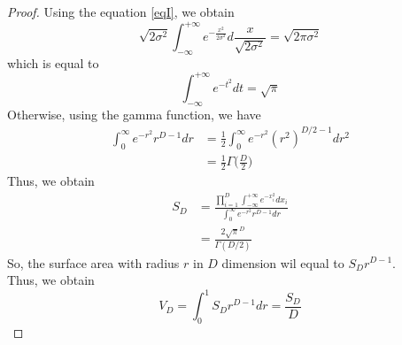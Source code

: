 \documentclass[12pt, a4paper]{article}
\newenvironment{exercise}[2][Ex]{\begin{trivlist}
\item[\hskip \labelsep {\bfseries #1}\hskip \labelsep {\bfseries #2.}]}{\end{trivlist}}
\begin{document}
\begin{exercise}{1.18(**)}
    \begin{proof}
        Using the equation \ref{eqI}, we obtain
        \[
        \sqrt{2\sigma^2}\int_{-\infty}^{+\infty}e^{-\frac{x^2}{2\sigma^2}}d\frac{x}
        {\sqrt{2\sigma^2}}=\sqrt{2\pi\sigma^2}
        \]
        which is equal to
        \begin{equation}
            \label{eq:eint}
            \int_{-\infty}^{+\infty}e^{-t^2}dt=\sqrt{\pi}
        \end{equation}
        Otherwise, using the gamma function, we have 
        \begin{align}
            \int_0^\infty e^{-r^2}r^{D-1}dr&=\frac{1}{2}\int_0^\infty
            e^{-r^2}(r^2)^{D/2-1}dr^2\nonumber\\
            &=\frac{1}{2}\Gamma\Big(\frac{D}{2}\Big)
        \end{align}
        Thus, we obtain
        \begin{align}
            S_D&=\frac{\prod_{i=1}^D\int_{-\infty}^{+\infty}e^{-x_i^2}dx_i}
            {\int_0^\infty e^{-r^2}r^{D-1}dr}\nonumber\\
            &=\frac{2\sqrt{\pi}^D}{\Gamma(D/2)}
        \end{align}
        So, the surface area with radius $r$ in $D$ dimension wil equal to $S_Dr^{D-1}$.\\
        Thus, we obtain
        \begin{equation}
            V_D=\int_0^1S_Dr^{D-1}dr=\frac{S_D}{D}
        \end{equation}
    \end{proof}
\end{exercise}
\end{document}
